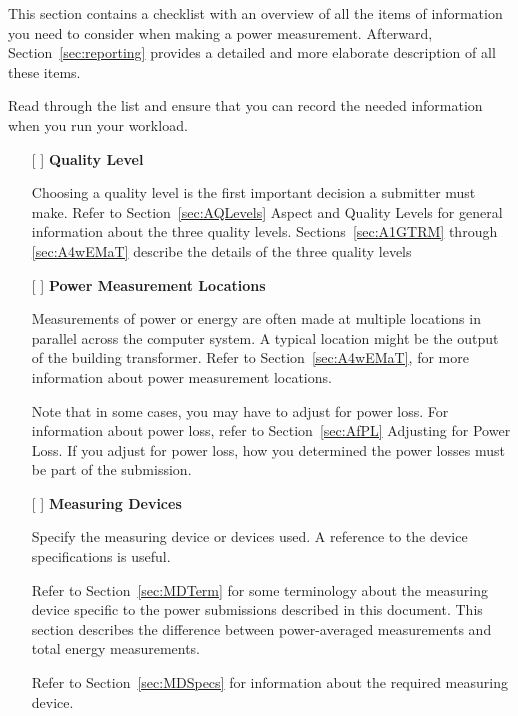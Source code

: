 \label{sec:checklist}

\noindent
This section contains a checklist with an overview of all the items of information you need to consider when making a power measurement.
Afterward, Section~\ref{sec:reporting} provides a detailed and more elaborate description of all these items.
\wl

\noindent
Read through the list and ensure that you can record the needed 
information when you run your workload.
\wl

\begin{itemize}
\item[{[ ]}]
\textbf{Quality Level}

Choosing a quality level is the first important decision a submitter must make. Refer to 
Section~\ref{sec:AQLevels} Aspect and Quality Levels for general information about the three quality levels.  
Sections~\ref{sec:A1GTRM} through \ref{sec:A4wEMaT} describe the details of the three quality levels

\item[{[ ]}]
\textbf{Power Measurement Locations}

Measurements of power or energy are often made at multiple locations in parallel across the computer system. A typical location might be the output of the building transformer.
Refer to Section~\ref{sec:A4wEMaT}, 
for more information about power measurement locations.

Note that in some cases, you may have to adjust for power loss. For information about power loss, refer to 
Section~\ref{sec:AfPL} Adjusting for Power Loss.  If you adjust for power loss, how you determined the power losses must be part of the submission.


\newpage

\item[{[ ]}]
\textbf{Measuring Devices}

Specify the measuring device or devices used. A reference to the device specifications is useful.

Refer to Section~\ref{sec:MDTerm} for some terminology about the measuring device specific to the power submissions described in this document. This section describes the difference between power-averaged measurements and total energy measurements.

Refer to Section~\ref{sec:MDSpecs} for information about the required measuring device.


\end{itemize}
